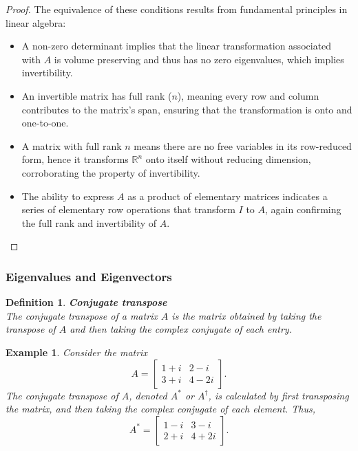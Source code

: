 \documentclass[11pt]{book} %
\newtheorem{definition}{Definition}[section]
\newtheorem{example}{Example}[section]
\begin{document}
\begin{proof}
The equivalence of these conditions results from fundamental principles in linear algebra:
\begin{itemize}
    \item A non-zero determinant implies that the linear transformation associated with \( A \) is volume preserving and thus has no zero eigenvalues, which implies invertibility.
    \item An invertible matrix has full rank (\( n \)), meaning every row and column contributes to the matrix's span, ensuring that the transformation is onto and one-to-one.
    \item A matrix with full rank \( n \) means there are no free variables in its row-reduced form, hence it transforms \( \mathbb{R}^n \) onto itself without reducing dimension, corroborating the property of invertibility.
    \item The ability to express \( A \) as a product of elementary matrices indicates a series of elementary row operations that transform \( I \) to \( A \), again confirming the full rank and invertibility of \( A \).
\end{itemize}
\end{proof}



\subsubsection{Eigenvalues and Eigenvectors}


\begin{definition}{\textbf{Conjugate transpose}} \\
    The conjugate transpose of a matrix \( A \) is the matrix obtained by taking the transpose of \( A \) and then taking the complex conjugate of each entry.
\end{definition}

\begin{example}
    Consider the matrix 
    \[
    A = \begin{bmatrix} 1+i & 2-i \\ 3+i & 4-2i \end{bmatrix}.
    \]
    The conjugate transpose of \( A \), denoted \( A^* \) or \( A^\dagger \), is calculated by first transposing the matrix, and then taking the complex conjugate of each element. Thus,
    \[
    A^* = \begin{bmatrix} 1-i & 3-i \\ 2+i & 4+2i \end{bmatrix}.
    \]
\end{example}
\end{document}
